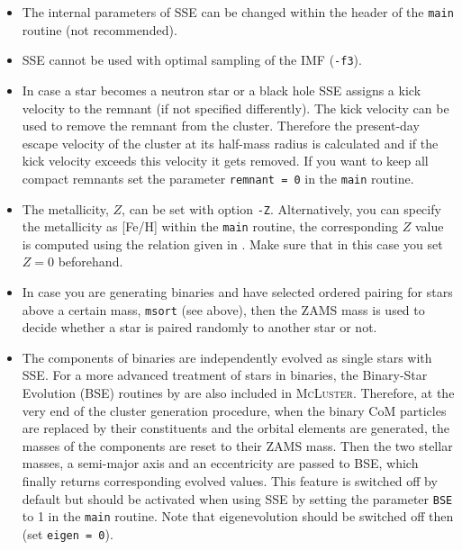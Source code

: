 \documentclass[useAMS,usenatbib]{mn2e}
\begin{document}
\begin{itemize}
\item The internal parameters of \textsc{SSE} can be changed within the header of the \texttt{main} routine (not recommended).
\item \textsc{SSE} cannot be used with optimal sampling of the IMF (\texttt{-f3}).
\item In case a star becomes a neutron star or a black hole \textsc{SSE} assigns a kick velocity to the remnant (if not specified differently). The kick velocity can be used to remove the remnant from the cluster. Therefore the present-day escape velocity of the cluster at its half-mass radius is calculated and if the kick velocity exceeds this velocity it gets removed. If you want to keep all compact remnants set the parameter \texttt{remnant = 0} in the \texttt{main} routine.
 \item The metallicity, $Z$, can be set with option \texttt{-Z}. Alternatively, you can specify the metallicity as [Fe/H] within the \texttt{main} routine, the corresponding $Z$ value is computed using the relation given in \citet{Bertelli94}. Make sure that in this case you set $Z = 0$ beforehand. 
\item In case you are generating binaries and have selected ordered pairing for stars above a certain mass, \texttt{msort} (see above), then the ZAMS mass is used to decide whether a star is paired randomly to another star or not.
\item The components of binaries are independently evolved as single stars with \textsc{SSE}. For a more advanced treatment of stars in binaries, the Binary-Star Evolution (\textsc{BSE}) routines by \citet{Hurley02} are also included in \textsc{McLuster}. Therefore, at the very end of the cluster generation procedure, when the binary CoM particles are replaced by their constituents and the orbital elements are generated, the masses of the components are reset to their ZAMS mass. Then the two stellar masses, a semi-major axis and an eccentricity are passed to \textsc{BSE}, which finally returns corresponding evolved values. This feature is switched off by default but should be activated when using \textsc{SSE} by setting the parameter \texttt{BSE} to 1 in the \texttt{main} routine. Note that eigenevolution should be switched off then (set  \texttt{eigen = 0}).
\end{itemize}
\end{document}
